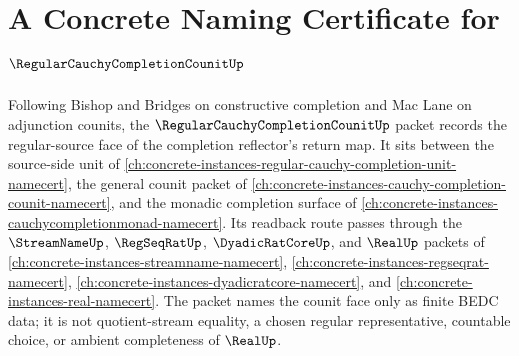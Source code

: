 \chapter{A Concrete Naming Certificate for $\RegularCauchyCompletionCounitUp$}
\label{ch:concrete-instances-regular-cauchy-completion-counit-namecert}

Following Bishop and Bridges on constructive completion and Mac Lane on adjunction counits, the $\RegularCauchyCompletionCounitUp$ packet records the regular-source face of the completion reflector's return map. It sits between the source-side unit of \autoref{ch:concrete-instances-regular-cauchy-completion-unit-namecert}, the general counit packet of \autoref{ch:concrete-instances-cauchy-completion-counit-namecert}, and the monadic completion surface of \autoref{ch:concrete-instances-cauchycompletionmonad-namecert}. Its readback route passes through the $\StreamNameUp$, $\RegSeqRatUp$, $\DyadicRatCoreUp$, and $\RealUp$ packets of \autoref{ch:concrete-instances-streamname-namecert}, \autoref{ch:concrete-instances-regseqrat-namecert}, \autoref{ch:concrete-instances-dyadicratcore-namecert}, and \autoref{ch:concrete-instances-real-namecert}. The packet names the counit face only as finite BEDC data; it is not quotient-stream equality, a chosen regular representative, countable choice, or ambient completeness of $\RealUp$.

